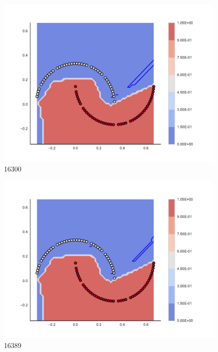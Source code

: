\begin{subfigure}[b]{0.09\textwidth}
    \includegraphics[clip, trim=2.35cm 1.75cm 4.5cm 0cm,width=\textwidth]{img/convergence/16300.pdf}
    \caption{16300}
    \label{fig:convergence_16300}
\end{subfigure}
%
\begin{subfigure}[b]{0.09\textwidth}
    \includegraphics[clip, trim=2.35cm 1.75cm 4.5cm 0cm,width=\textwidth]{img/convergence/16389.pdf}
    \caption{16389}
    \label{fig:convergence_16389}
\end{subfigure}
%
